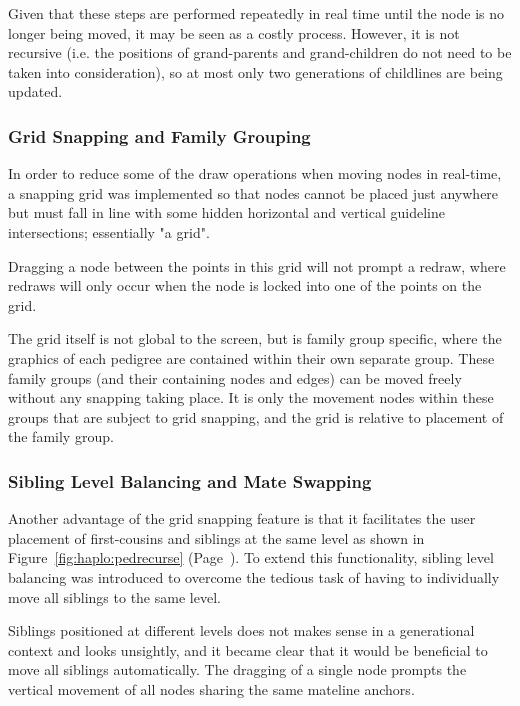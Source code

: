 Given that these steps are performed repeatedly in real time until the node is no longer being moved, it may be seen as a costly process. However, it is not recursive (i.e. the positions of grand-parents and grand-children do not need to be taken into consideration), so at most only two generations of childlines are being updated.

\subsubsection{Grid Snapping and Family Grouping}

In order to reduce some of the draw operations when moving nodes in real-time, a snapping grid was implemented so that nodes cannot be placed just anywhere but must fall in line with some hidden horizontal and vertical guideline intersections; essentially "a grid". 

Dragging a node between the points in this grid will not prompt a redraw, where redraws will only occur when the node is locked into one of the points on the grid.  

The grid itself is not global to the screen, but is family group specific, where the graphics of each pedigree are contained within their own separate group. These family groups (and their containing nodes and edges) can be moved freely without any snapping taking place. It is only the movement nodes within these groups that are subject to grid snapping, and the grid is relative to placement of the family group.

\subsubsection{Sibling Level Balancing and Mate Swapping}

Another advantage of the grid snapping feature is that it facilitates the user placement of first-cousins and siblings at the same level as shown in Figure~\ref{fig:haplo:pedrecurse} (Page~\pageref{fig:haplo:pedrecurse}). 
To extend this functionality,  sibling level balancing was introduced to overcome the tedious task of having to individually move all siblings to the same level. 

Siblings positioned at different levels does not makes sense in a generational context and looks unsightly, and it became clear that it would be beneficial to move all siblings automatically. The dragging of a single node prompts the vertical movement of all nodes sharing the same mateline anchors. 

